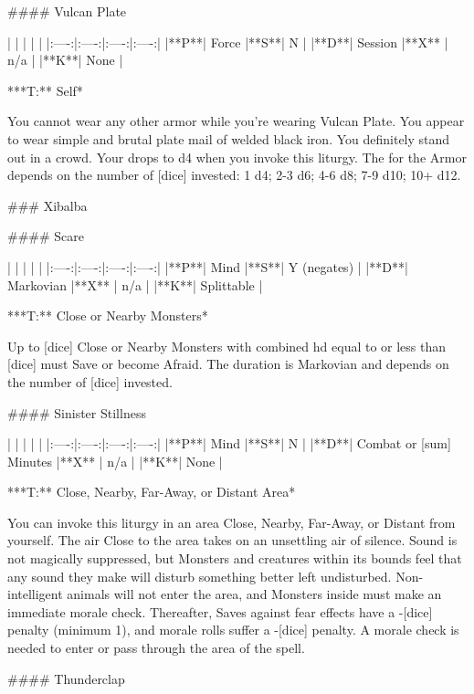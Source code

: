 #### Vulcan Plate

| | | | |
|:----:|:----:|:----:|:----:|
|**P**| Force |**S**|  N |
|**D**| Session |**X** |  n/a  |
|**K**| None |


***T:**   Self*



You cannot wear any other armor while you're wearing Vulcan Plate.  You appear to wear simple and brutal plate mail of welded black iron.  You definitely stand out in a crowd.  Your \MD drops to d4 when you invoke this liturgy.  The \UD for the Armor depends on the number of [dice] invested: 1 d4; 2-3 d6; 4-6 d8; 7-9 d10; 10+ d12.


### Xibalba





#### Scare

| | | | |
|:----:|:----:|:----:|:----:|
|**P**| Mind |**S**|  Y (negates) |
|**D**| Markovian |**X** |  n/a  |
|**K**| Splittable |


***T:**   Close or Nearby Monsters*



Up to [dice] Close or Nearby Monsters with combined {hd} equal to or less than [dice] must Save or become Afraid.  The duration is Markovian and depends on the number of [dice] invested.





#### Sinister Stillness

| | | | |
|:----:|:----:|:----:|:----:|
|**P**| Mind |**S**|  N |
|**D**| Combat or [sum] Minutes |**X** |  n/a  |
|**K**| None |


***T:**   Close, Nearby, Far-Away, or Distant Area*



You can invoke this liturgy in an area  Close, Nearby, Far-Away, or Distant from yourself.  The air Close to the area takes on an unsettling air of silence.  Sound is not magically suppressed, but Monsters and creatures within its bounds feel that any sound they make will disturb something better left undisturbed.  Non-intelligent animals will not enter the area, and Monsters inside must make an immediate morale check. Thereafter, Saves against fear effects have a -[dice] penalty (minimum 1), and morale rolls suffer a -[dice] penalty.  A morale check is needed to enter or pass through the area of the spell.




#### Thunderclap

